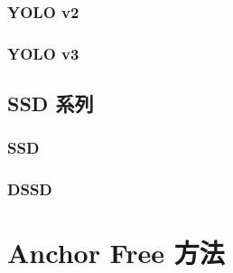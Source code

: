 \subsection{YOLO v2}
\label{subsec:YOLOv2}

\subsection{YOLO v3}
\label{subsec:YOLOv3}

\section{SSD 系列}
\label{sec:SSD}

\subsection{SSD}
\label{subsec:SSD}

\subsection{DSSD}
\label{subsec:DSSD}

\chapter{Anchor Free 方法}


